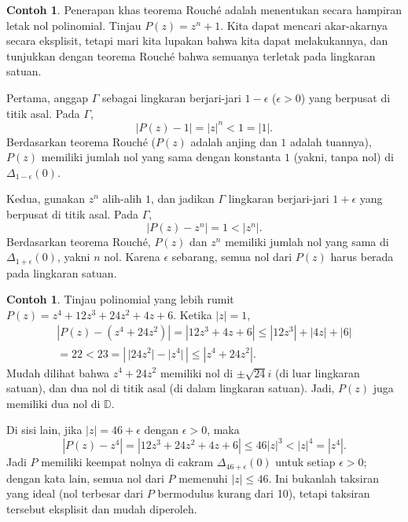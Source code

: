 \documentclass[12pt,openany]{book}
\newcommand{\sabs}[1]{\lvert {#1} \rvert}
\newcommand{\abs}[1]{\left\lvert {#1} \right\rvert}
\newcommand{\D}{{\mathbb{D}}}
\theoremstyle{plain}
\theoremstyle{remark}
\theoremstyle{definition}
\theoremstyle{exercise}
\theoremstyle{example}
\newtheorem{example}[thm]{Contoh}
\begin{document}
\begin{example}
Penerapan khas teorema Rouch\'e adalah menentukan secara hampiran letak nol
polinomial.  Tinjau $P(z) = z^n + 1$.  Kita dapat mencari akar-akarnya secara eksplisit,
tetapi mari kita lupakan bahwa kita dapat melakukannya,
dan tunjukkan dengan teorema Rouch\'e bahwa semuanya terletak pada lingkaran satuan.

Pertama,
anggap $\Gamma$ sebagai lingkaran berjari-jari $1-\epsilon$ ($\epsilon > 0$)
yang berpusat di titik asal.  Pada $\Gamma$,
\begin{equation*}
\abs{P(z) - 1} = \abs{z}^n < 1 = \sabs{1}.
\end{equation*}
Berdasarkan teorema Rouch\'e ($P(z)$ adalah anjing dan $1$ adalah tuannya), $P(z)$
memiliki jumlah nol yang sama dengan konstanta $1$ (yakni, tanpa nol) di
$\Delta_{1-\epsilon}(0)$.

Kedua, gunakan $z^n$ alih-alih $1$, dan jadikan $\Gamma$ lingkaran
berjari-jari $1+\epsilon$ yang berpusat di titik asal.  Pada $\Gamma$,
\begin{equation*}
\abs{P(z) - z^n} = 1 < \abs{z^n} .
\end{equation*}
Berdasarkan teorema Rouch\'e, $P(z)$ dan $z^n$ memiliki jumlah nol yang sama di
$\Delta_{1+\epsilon}(0)$, yakni $n$ nol.  Karena $\epsilon$ sebarang,
semua nol dari $P(z)$ harus berada pada lingkaran satuan.
\end{example}

\begin{example}
Tinjau polinomial yang lebih rumit $P(z) = z^4+12z^3+24z^2+4z+6$.
Ketika $\sabs{z}=1$,
\begin{multline*}
\abs{P(z)-(z^4+24z^2)} =
\abs{12z^3+4z+6} \leq
\abs{12z^3}+\abs{4z}+\abs{6} \\
= 22 < 23 = \abs{\,\sabs{24 z^2} - \sabs{z^4}\,}
\leq \abs{z^4+24z^2} .
\end{multline*}
Mudah dilihat bahwa $z^4+24z^2$ memiliki nol di $\pm \sqrt{24} i$ (di luar
lingkaran satuan), dan dua nol di titik asal (di dalam lingkaran satuan).
Jadi, $P(z)$ juga memiliki dua nol di $\D$.

Di sisi lain, jika $\sabs{z} = 46+ \epsilon$ dengan $\epsilon > 0$, maka
\begin{equation*}
\abs{P(z)-z^4} = \abs{12z^3+24z^2+4z+6}
\leq 46 \sabs{z}^3 < {\sabs{z}}^4 = \abs{z^4}.
\end{equation*}
Jadi $P$ memiliki keempat nolnya di cakram $\Delta_{46+\epsilon}(0)$ untuk setiap
$\epsilon > 0$;
dengan kata lain, semua nol dari $P$ memenuhi $\sabs{z} \leq 46$.
Ini bukanlah taksiran yang ideal (nol terbesar dari $P$ bermodulus kurang dari
10), tetapi taksiran tersebut eksplisit dan mudah diperoleh.
\end{example}
\end{document}
